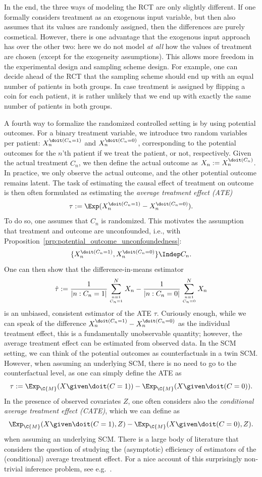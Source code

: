 In the end, the three ways of modeling the RCT are only slightly different. If one
formally considers treatment as an exogenous input variable, but then also assumes
that its values are randomly assigned, then the differences are purely cosmetical.
However, there is one advantage that the exogenous input approach has over the other
two: here we do not model \emph{at all} how the values of treatment are chosen
(except for the exogeneity assumptions). This allows more freedom in the experimental
design and sampling scheme design. For example, one can decide ahead of the RCT that 
the sampling scheme should end up with an equal number of patients in both groups. 
In case treatment is assigned by flipping a coin for each patient, it is rather unlikely
that we end up with exactly the same number of patients in both groups. 

A fourth way to formalize the randomized controlled setting is by using potential outcomes.
For a binary treatment variable, we introduce two random variables per patient:
$X^{\doit(C_n=1)}_n$ and $X^{\doit(C_n=0)}_n$, corresponding to the potential outcomes for
the $n$'th patient if we treat the patient, or not, respectively. 
Given the actual treatment $C_n$, we then define the actual outcome as 
$X_n := X_n^{\doit(C_n)}$. In practice, we only observe the actual outcome, and the
other potential outcome remains latent. The task of estimating the causal effect of
treatment on outcome is then often formulated as estimating the
\emph{average treatment effect (ATE)}
$$\tau := \Exp(X_n^{\doit(C_n=1)} - X_n^{\doit(C_n=0)}).$$
To do so, one assumes that $C_n$ is randomized. This motivates the assumption
that treatment and outcome are unconfounded, i.e., with Proposition~\ref{prp:potential_outcome_unconfoundedness}:
$$\{X_n^{\doit(C_n=1)},X_n^{\doit(C_n=0)}\} \Indep C_n.$$
One can then show that the difference-in-means estimator 
$$\hat{\tau} := \frac{1}{|n : C_n=1|} \sum_{n=1 \atop C_n=1}^N X_n - \frac{1}{|n : C_n=0|} \sum_{n=1 \atop C_n=0}^N X_n$$
is an unbiased, consistent estimator of the ATE $\tau$.
Curiously enough, while we can speak of the difference
$X_n^{\doit(C_n=1)} - X_n^{\doit(C_n=0)}$ as the individual treatment effect,
this is a fundamentally unobservable quantity; however, the average treatment effect can 
be estimated from observed data. In the SCM setting, we can think of the potential
outcomes as counterfactuals in a twin SCM. However, when assuming an underlying SCM,
there is no need to go to the counterfactual level, as one can simply define the
ATE as
$$\tau := \Exp_{\C{M}}(X \given \doit(C=1)) - \Exp_{\C{M}}(X \given \doit(C=0)).$$
In the presence of observed covariates $Z$, one often considers also the \emph{conditional
average treatment effect (CATE)}, which we can define as
$$\Exp_{\C{M}}(X \given \doit(C=1),Z) - \Exp_{\C{M}}(X \given \doit(C=0),Z).$$
when assuming an underlying SCM. There is a large body of literature that considers the
question of studying the (asymptotic) efficiency of estimators of the (conditional)
average treatment effect. For a nice account of this surprisingly non-trivial inference problem, 
see e.g.\ \cite{Wager2020}.


